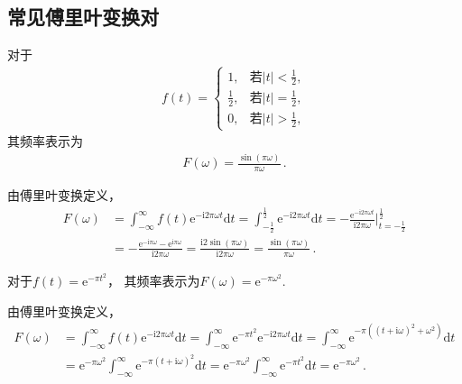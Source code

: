 \subsection{常见傅里叶变换对}\label{sub:常见傅里叶变换对}
\begin{theorem}
    对于
    \begin{align}
        f(t)=\left\{\begin{array}{ll}
            1,                        & \displaystyle\text{若}|t|<\frac{1}{2}, \\
            \displaystyle\frac{1}{2}, & \displaystyle\text{若}|t|=\frac{1}{2}, \\
            0,                        & \displaystyle\text{若}|t|>\frac{1}{2},
        \end{array}\right.
    \end{align}
    其频率表示为
    \begin{align}
        F(\omega)=\frac{\sin(\pi\omega)}{\pi\omega}\, .
    \end{align}
\end{theorem}
\begin{prove}
    由傅里叶变换定义，
    \begin{align}
        F(\omega) & =\int_{-\infty}^{\infty}f(t)\mathrm{e}^{-\mathrm{i}2\pi\omega t}\mathrm{d}t
        =\int_{-\frac{1}{2}}^{\frac{1}{2}}\mathrm{e}^{-\mathrm{i}2\pi\omega t}\mathrm{d}t
        =-\frac{\mathrm{e}^{-\mathrm{i}2\pi\omega t}}{\mathrm{i}2\pi\omega}\bigg|_{t=-\frac{1}{2}}^{\frac{1}{2}}\nonumber \\
                  & =-\frac{\mathrm{e}^{-\mathrm{i}\pi\omega}-\mathrm{e}^{\mathrm{i}\pi\omega}}{\mathrm{i}2\pi\omega}
        =\frac{\mathrm{i}2\sin(\pi\omega)}{\mathrm{i}2\pi\omega}
        =\frac{\sin(\pi\omega)}{\pi\omega}\, .
    \end{align}
\end{prove}

\begin{theorem}
    对于$f(t)=\mathrm{e}^{-\pi t^2}$，
    其频率表示为$F(\omega)=\mathrm{e}^{-\pi\omega^2}$.
\end{theorem}
\begin{prove}
    由傅里叶变换定义，
    \begin{align}
        F(\omega) & =\int_{-\infty}^{\infty}f(t)\mathrm{e}^{-\mathrm{i}2\pi\omega t}\mathrm{d}t
        =\int_{-\infty}^{\infty}\mathrm{e}^{-\pi t^2}\mathrm{e}^{-\mathrm{i}2\pi\omega t}\mathrm{d}t
        =\int_{-\infty}^{\infty}\mathrm{e}^{-\pi((t+\mathrm{i}\omega)^2+\omega^2)}\mathrm{d}t\nonumber                  \\
                  & =\mathrm{e}^{-\pi\omega^2}\int_{-\infty}^{\infty}\mathrm{e}^{-\pi(t+\mathrm{i}\omega)^2}\mathrm{d}t
        =\mathrm{e}^{-\pi\omega^2}\int_{-\infty}^{\infty}\mathrm{e}^{-\pi t^2}\mathrm{d}t
        =\mathrm{e}^{-\pi\omega^2}\, .
    \end{align}
\end{prove}

